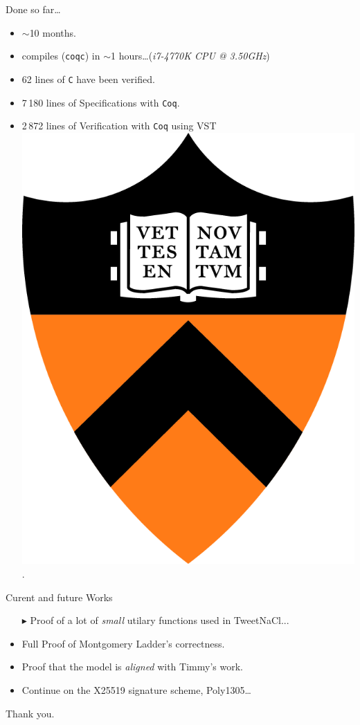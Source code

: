 \documentclass[8pt]{beamer}
\begin{document}
\begin{frame}[fragile]{Done so far\ldots}
    \begin{itemize}
    \item $\sim$10 months.
    \item compiles ({\tt coqc}) in $\sim$1 hours\ldots ({\it i7-4770K CPU @ 3.50GHz})
    \item 62 lines of {\tt C} have been verified.
    \item 7\,180 lines of Specifications with {\tt Coq}.
    \item 2\,872 lines of Verification with {\tt Coq} using VST \includegraphics[height=\fontcharht\font`\B]{princeton-logo}.
    \end{itemize}
\end{frame}

\begin{frame}[fragile]{Curent and future Works}
    \begin{itemize}
      \item[\color{ruDarkTeal}$\blacktriangleright$] Proof of a lot of {\it small} utilary functions used in TweetNaCl...
      \item Full Proof of Montgomery Ladder's correctness.
      \item Proof that the model is {\it aligned} with Timmy's work.
      \item Continue on the X25519 signature scheme, Poly1305\ldots
    \end{itemize}
\end{frame}

%
%
\begin{frame}[standout]
	\Huge Thank you.
\end{frame}
\end{document}
